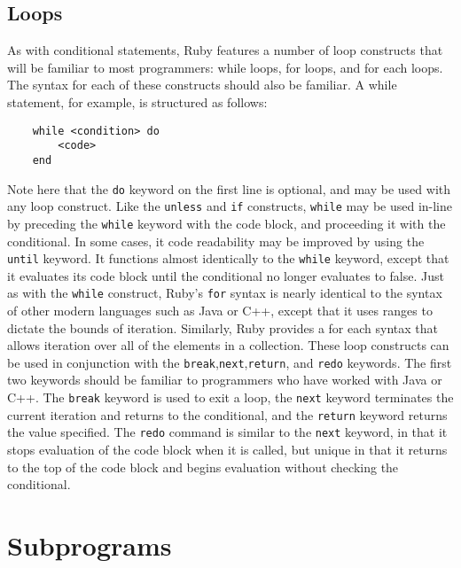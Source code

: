 \documentclass[12pt]{article}
\begin{document}
\subsection{Loops}
As with conditional statements, Ruby features a number of loop constructs that will be familiar to most programmers: while loops, for loops, and for each loops. The syntax for each of these constructs should also be familiar. A while statement, for example, is structured as follows:
\begin{lstlisting}
    while <condition> do
        <code>
    end
\end{lstlisting}
Note here that the \verb|do| keyword on the first line is optional, and may be used with any loop construct\cite{ctrl_struct}. 
Like the \verb|unless| and \verb|if| constructs, \verb|while| may be used in-line by preceding the \verb|while| keyword with the code block, and proceeding it with the conditional. In some cases, it code readability may be improved by using the \verb|until| keyword. It functions almost identically to the \verb|while| keyword, except that it evaluates its code block until the conditional no longer evaluates to false\cite{ctrl_struct}.
Just as with the \verb|while| construct, Ruby's \verb|for| syntax is nearly identical to the syntax of other modern languages such as Java or C++, except that it uses ranges to dictate the bounds of iteration. Similarly, Ruby provides a for each syntax that allows iteration over all of the elements in a collection\cite{flow_control}.
These loop constructs can be used in conjunction with the \verb|break|,\verb|next|,\verb|return|, and \verb|redo| keywords. The first two keywords should be familiar to programmers who have worked with Java or C++. The \verb|break| keyword is used to exit a loop, the \verb|next| keyword terminates the current iteration and returns to the conditional, and the \verb|return| keyword returns the value specified. The \verb|redo| command is similar to the \verb|next| keyword, in that it stops evaluation of the code block when it is called, but unique in that it returns to the top of the code block and begins evaluation without checking the conditional\cite{flow_control}.

\section{Subprograms}
\pagebreak
\nocite{*}

{}
\end{document}
